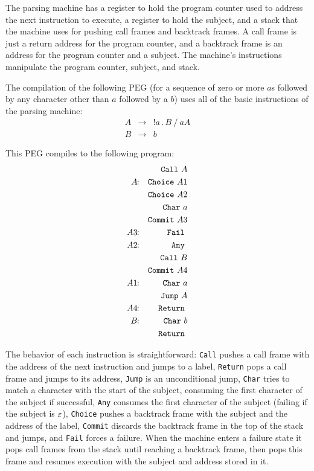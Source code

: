The parsing machine has a register to hold the program counter used to
address the next instruction to execute, a register to hold the
subject, and a stack that the machine uses for pushing call frames and
backtrack frames. A call frame is just a return address for the
program counter, and a backtrack frame is an address for the program
counter and a subject. The machine's instructions manipulate the
program counter, subject, and stack.

The compilation of the following PEG (for a sequence of zero or more
$a$s followed by any character other than $a$ followed by a $b$) uses
all of the basic instructions of the parsing machine:
\begin{eqnarray*}
A & \rightarrow & !a \, . \, B \ / \ aA \\
B & \rightarrow & b
\end{eqnarray*}

This PEG compiles to the following program:
\begin{eqnarray*}
& &    \In{Call}{A} \\
A\!\!: & & \In{Choice}{A1} \\
& &    \In{Choice}{A2} \\
& &    \In{Char}{a} \\
& &    \In{Commit}{A3} \\
A3\!\!: & & \In{Fail}{} \\
A2\!\!: & & \In{Any}{} \\
& &    \In{Call}{B} \\
& &    \In{Commit}{A4} \\
A1\!\!: & & \In{Char}{a} \\
& &    \In{Jump}{A} \\
A4\!\!: & & \In{Return}{} \\
B\!\!: & & \In{Char}{b} \\
& &    \In{Return}{}
\end{eqnarray*}

The behavior of each instruction is straightforward: \texttt{Call}
pushes a call frame with the address of the next instruction and jumps
to a label, \texttt{Return} pops a call frame and jumps to its
address, \texttt{Jump} is an unconditional jump, \texttt{Char} tries
to match a character with the start of the subject, consuming the
first character of the subject if successful, \texttt{Any} consumes
the first character of the subject (failing if the subject is
$\Epsi$), \texttt{Choice} pushes a backtrack frame with the subject
and the address of the label, \texttt{Commit} discards the backtrack
frame in the top of the stack and jumps, and \texttt{Fail} forces a
failure. When the machine enters a failure state it pops call frames
from the stack until reaching a backtrack frame, then pops this frame
and resumes execution with the subject and address stored in it.

